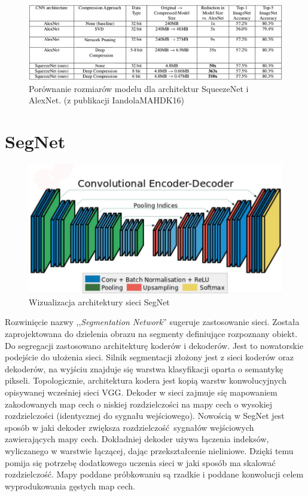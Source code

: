 \documentclass[12pt,a4paper,twoside,titlepage,openright]{book}
\begin{document}
\begin{figure}[ht]
	\centering
			\includegraphics[resolution=100, scale=0.55]{squeezeNetCompression.png}
		\caption{Porównanie rozmiarów modelu dla architektur SqueezeNet i AlexNet. (z publikacji IandolaMAHDK16)}
\end{figure}

\section{SegNet}
\begin{figure}[ht]
	\centering
			\includegraphics[resolution=100, scale=0.4]{SegNet.png}
		\caption{Wizualizacja architektury sieci SegNet}
\end{figure}
Rozwinięcie nazwy ,,\textit{Segmentation Network}'' sugeruje zastosowanie sieci. Została zaprojektowana do dzielenia obrazu na segmenty definiujące rozpoznany obiekt. Do segregacji zastosowano architekturę koderów i dekoderów. Jest to nowatorskie podejście do ułożenia sieci. Silnik segmentacji złożony jest z sieci koderów oraz dekoderów, na wyjściu znajduje się warstwa klasyfikacji oparta o semantykę pikseli. Topologicznie, architektura kodera jest kopią warstw konwolucyjnych opisywanej wcześniej sieci VGG. Dekoder w sieci zajmuje się mapowaniem zakodowanych map cech o niskiej rozdzielczości na mapy cech o wysokiej rozdzielczości (identycznej do sygnału wejściowego). Nowością w SegNet jest sposób w jaki dekoder zwiększa rozdzielczość sygnałów wejściowych zawierających mapy cech. Dokładniej dekoder używa łączenia indeksów, wyliczanego w warstwie łączącej, dając przekształcenie nieliniowe. Dzięki temu pomija się potrzebę dodatkowego uczenia sieci w jaki sposób ma skalować rozdzielczość. Mapy poddane próbkowaniu są rzadkie i poddane konwolucji celem wyprodukowania gęstych map cech.
\end{document}
